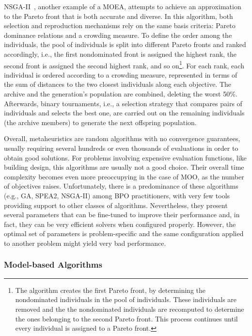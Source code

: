 	\ac{NSGA-II}~\cite{Deb2002}, another example of a \ac{MOEA}, attempts to achieve an approximation to the Pareto front that is both accurate and diverse. In this algorithm, both selection and reproduction mechanisms rely on the same basis criteria: Pareto dominance relations and a crowding measure. To define the order among the individuals, the pool of individuals is split into different Pareto fronts and ranked accordingly, i.e., the first nondominated front is assigned the highest rank, the second front is assigned the second highest rank, and so on\footnote{The algorithm creates the first Pareto front, by determining the nondominated individuals in the pool of individuals. These individuals are removed and the the nondominated individuals are recomputed to determine the ones belonging to the second Pareto front. This process continues until every individual is assigned to a Pareto front.}. For each rank, each individual is ordered according to a crowding measure, represented in terms of the sum of distances to the two closest individuals along each objective. The archive and the generation's population are combined, deleting the worst 50\%. Afterwards, binary tournaments, i.e., a selection strategy that compares pairs of individuals and selects the best one, are carried out on the remaining individuals (the archive members) to generate the next offspring population.	
	
	Overall, metaheuristics are random algorithms with no convergence guarantees, usually requiring several hundreds or even thousands of evaluations in order to obtain good solutions. For problems involving expensive evaluation functions, like building design, this algorithms are usually not a good choice. Their overall time complexity becomes even more preoccupying in the case of \ac{MOO}, as the number of objectives raises.  Unfortunately, there is a predominance of these algorithms (e.g., \ac{GA}, \ac{SPEA2}, \ac{NSGA-II}) among \ac{BPO} practitioners, with very few tools providing support to other classes of algorithms. Nevertheless, they present several parameters that can be fine-tuned to improve their performance and, in fact, they can be very efficient solvers when configured properly. However, the optimal set of parameters is problem-specific and the same configuration applied to another problem might yield very bad performance.
	
	\subsubsection{Model-based Algorithms}
	\label{ssec:model-based}
	
